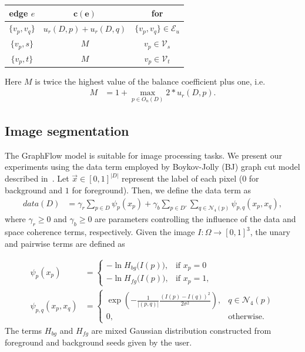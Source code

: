 \documentclass[runningheads]{llncs}
\newcommand{\daniel}[1]{ {\color{blue}#1} }
\begin{document}
\begin{center}
\begin{tabular}{|c|c|c|}
\hline
\textbf{edge} $e$ & $\mathbf{c(e)}$ & \textbf{for}\\
\hline
$\{v_p, v_q\}$ & $ u_r(D,p) + u_r(D,q) $ & $\{v_p,v_q\} \in \mathcal{E}_{u}$\\
\hline
$\{v_p, s\}$ & $M$ & $v_p \in \mathcal{V}_{s}$ \\
\hline
$\{v_p, t\}$ & $M$ & $v_p \in \mathcal{V}_{t}$ \\
\hline
\end{tabular}
\end{center}


Here $M$ is twice the highest value of the balance coefficient plus one, i.e.
\begin{align*}
	M &= 1+\max_{p \in O_n(D)} 2*u_r(D,p).
\end{align*}
%

\daniel{\subsection{Image segmentation}
The GraphFlow model is suitable for image processing tasks. We present our experiments using the data term employed by Boykov-Jolly (BJ) graph cut model described in~\cite{boykov01graphcut}. Let $\vec{x} \in [0,1]^{|D|}$ represent the label of each pixel ($0$ for background and $1$ for foreground). Then, we define the data term as
%
\begin{align*}
	data(D) &= \gamma_r \sum_{p \in D}{ \psi_p(x_p) } + \gamma_b \sum_{p \in D'}\sum_{q \in \mathcal{N}_{4}(p)}{\psi_{p,q}(x_p,x_q)},
\end{align*}
where $\gamma_r \geq 0$ and $\gamma_b \geq 0$ are parameters controlling the influence of the data and space coherence terms, respectively. Given the image $I:\Omega \rightarrow [0,1]^3$, the unary and pairwise terms are defined as}
\begin{align*}
	\psi_p(x_p) &= \left\{ \begin{array}{ll}
	-\ln  H_{bg}\big( I(p) \big), & \text{if } x_p=0  \\[1em]	
	-\ln  H_{fg}\big( I(p) \big), & \text{if } x_p=1,
	\end{array}\right.\\[1em]
	\psi_{p,q}(x_p,x_q) &= \left\{ \begin{array}{ll}
	\displaystyle \exp{ \left(- \frac{1}{ |(p,q)| }\frac{(I(p) - I(q))^2}{2\sigma^2} \right) }, & q \in \mathcal{N}_4(p) \\[1em]
	0, & \text{otherwise}.
	\end{array}\right.
\end{align*}
%
\daniel{The terms $H_{bg}$ and $H_{fg}$ are mixed Gaussian distribution constructed from foreground and background seeds given by the user. }
%
%
\end{document}
